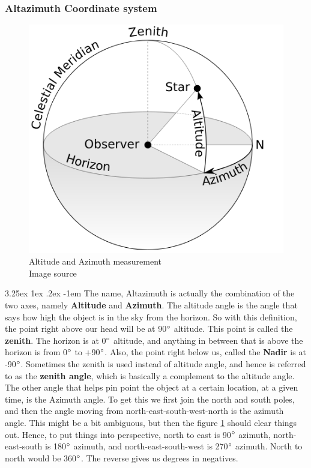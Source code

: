 \documentclass[a4paper,twoside,11pt]{article}
\makeatletter
\numberwithin{equation}{section}
\renewcommand\paragraph{\@startsection{paragraph}{5}{\z@}%
  {3.25ex \@plus1ex \@minus.2ex}%
  {-1em}%
  {\normalfont\normalsize\bfseries}}
\makeatother
\begin{document}
\subsubsection{Altazimuth Coordinate system}
\begin{figure}
\includegraphics[width=0.9\linewidth]{fig1.png} 
\caption{Altitude and Azimuth measurement \\ Image source \cite{azimuth_wiki}}
\label{fig1}
\end{figure}
\paragraph{}
The name, Altazimuth is actually the combination of the two axes, namely \textbf{Altitude} and \textbf{Azimuth}. The altitude angle is the angle that says how high the object is in the sky from the horizon. So with this definition, the point right above our head will be at 90$\degree$ altitude. This point is called the \textbf{zenith}. The horizon is at 0$\degree$ altitude, and anything in between that is above the horizon is from 0$\degree$ to +90$\degree$. Also, the point right below us, called the \textbf{Nadir} is at -90$\degree$. Sometimes the zenith is used instead of altitude angle, and hence is referred to as the \textbf{zenith angle}, which is basically a complement to the altitude angle. The other angle that helps pin point the object at a certain location, at a given time, is the Azimuth angle. To get this we first join the north and south poles, and then the angle moving from north-east-south-west-north is the azimuth angle. This might be a bit ambiguous, but then the figure \ref{fig1} should clear things out. Hence, to put things into perspective, north to east is 90$\degree$ azimuth, north-east-south is 180$\degree$ azimuth, and north-east-south-west is 270$\degree$ azimuth. North to north would be 360$\degree$. The reverse gives us degrees in negatives. 
\end{document}
